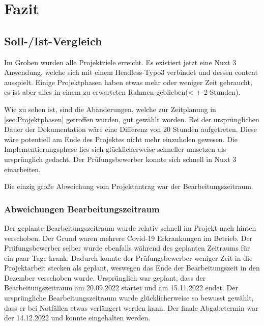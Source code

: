 \section{Fazit} 
\label{sec:Fazit}

\subsection{Soll-/Ist-Vergleich}
\label{sec:SollIstVergleich}

Im Groben wurden alle Projektziele erreicht. Es existiert jetzt eine Nuxt 3 Anwendung, welche sich mit einem Headless-Typo3 verbindet und dessen content ausspielt. Einige Projektphasen haben etwas mehr oder weniger Zeit gebraucht, es ist aber alles in einem zu erwarteten Rahmen geblieben(< +-2 Stunden).


Wie zu sehen ist, sind die Abänderungen, welche zur Zeitplanung in \ref{sec:Projektphasen} getroffen wurden, gut gewählt worden. Bei der ursprünglichen Dauer der Dokumentation wäre eine Differenz von 20 Stunden aufgetreten. Diese wäre potentiell am Ende des Projektes nicht mehr einzuholen gewesen. Die Implementierungsphase lies sich glücklicherweise schneller umsetzen als ursprünglich gedacht. Der Prüfungsbewerber konnte sich schnell in Nuxt 3 einarbeiten.

Die einzig große Abweichung vom Projektantrag war der Bearbeitungszeitraum.



\subsubsection{Abweichungen Bearbeitungszeitraum}
\label{sec:AbweichungenProjektantrag}
Der geplante Bearbeitungszeitraum wurde relativ schnell im Projekt nach hinten verschoben. Der Grund waren mehrere Covid-19 Erkrankungen im Betrieb. Der Prüfungsbewerber selber wurde ebenfalls während des geplanten Zeitraums für ein paar Tage krank. Dadurch konnte der Prüfungsbewerber weniger Zeit in die Projektarbeit stecken als geplant, weswegen das Ende der Bearbeitungszeit in den Dezember verschoben wurde. Ursprünglich war geplant, dass der Bearbeitungszeitraum am 20.09.2022 startet und am 15.11.2022 endet. Der ursprüngliche Bearbeitungszeitraum wurde glücklicherweise so bewusst gewählt, dass er bei Notfällen etwas verlängert werden kann. Der finale Abgabetermin war der 14.12.2022 und konnte eingehalten werden.


